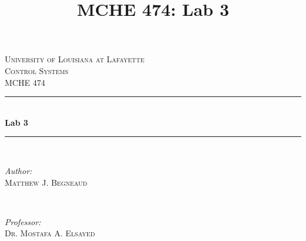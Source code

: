 \documentclass[12pt]{article}
\title{MCHE 474: Lab 3}
\begin{document}




\begin{titlepage}

\newcommand{\HRule}{\rule{\linewidth}{0.5mm}} %

\center %
 

\textsc{\LARGE University of Louisiana at Lafayette}\\[1.5cm] %
\textsc{\Large Control Systems}\\[0.5cm] %
\textsc{\large MCHE 474}\\[0.5cm] %


\HRule \\[0.4cm]
{ \huge \bfseries Lab 3}\\[0.4cm] %
\HRule \\[1.5cm]
 

\begin{minipage}{0.4\textwidth}
\begin{flushleft} \large
\emph{Author:}\\
\textsc{Matthew J. Begneaud} \\%
\end{flushleft}
\end{minipage}
~
\begin{minipage}{0.4\textwidth}
\begin{flushright} \large
\emph{Professor:} \\
\textsc{Dr. Mostafa A. Elsayed} %
\end{flushright}
\end{minipage}\\[1.5cm]


\end{titlepage}
\end{document}
